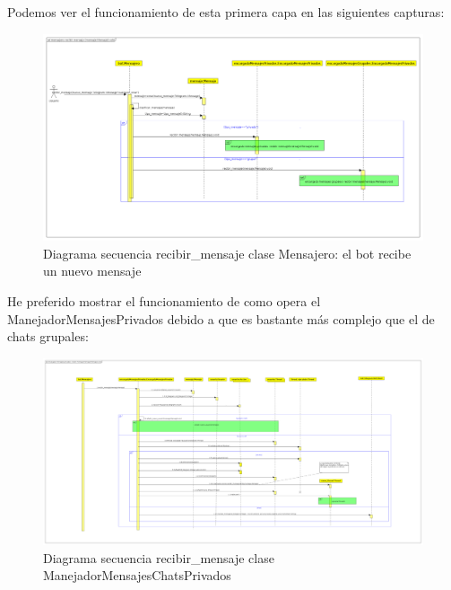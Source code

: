 Podemos ver el funcionamiento de esta primera capa en las siguientes capturas:
\begin{figure}[H] %
\centering
\includegraphics[scale=0.2]{imagenes/diagramas/secuencia/grandes/nuevo_mensaje.png}  %

\caption{Diagrama secuencia recibir\_mensaje clase  Mensajero: el bot recibe un nuevo mensaje}\label{figura220}
\end{figure}

He preferido mostrar el funcionamiento de como opera el ManejadorMensajesPrivados debido a que es bastante más complejo que el de chats grupales:


\begin{figure}[H] %
\centering
\includegraphics[scale=0.12]{imagenes/diagramas/secuencia/grandes/clasificar_mensaje_comprimido.png}  %

\caption{Diagrama secuencia recibir\_mensaje clase  ManejadorMensajesChatsPrivados}\label{figura221}
\end{figure}




